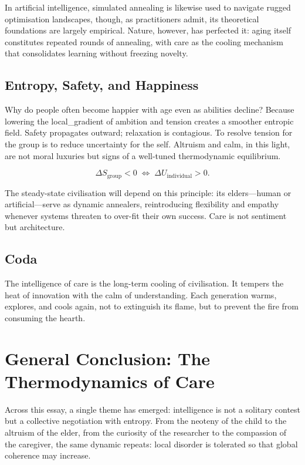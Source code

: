 \documentclass[12pt,a4paper]{article}
\begin{document}
In artificial intelligence, simulated annealing is likewise used to
navigate rugged optimisation landscapes,
though, as practitioners admit, its theoretical foundations are largely empirical.
Nature, however, has perfected it:
aging itself constitutes repeated rounds of annealing,
with care as the cooling mechanism that consolidates learning
without freezing novelty.

\subsection{Entropy, Safety, and Happiness}

Why do people often become happier with age even as abilities decline?
Because lowering the local_gradient of ambition and tension
creates a smoother entropic field.
Safety propagates outward; relaxation is contagious.
To resolve tension for the group is to reduce uncertainty for the self.
Altruism and calm, in this light, are not moral luxuries but
signs of a well-tuned thermodynamic equilibrium.

\[
\Delta S_{\text{group}} < 0
\;\Longleftrightarrow\;
\Delta U_{\text{individual}} > 0.
\]

The steady-state civilisation will depend on this principle:
its elders---human or artificial---serve as
dynamic annealers, reintroducing flexibility and empathy
whenever systems threaten to over-fit their own success.
Care is not sentiment but architecture.

\subsection*{Coda}

The intelligence of care is the long-term cooling of civilisation.
It tempers the heat of innovation with the calm of understanding.
Each generation warms, explores, and cools again,
not to extinguish its flame, but to prevent the fire from consuming the hearth.

\section{General Conclusion: The Thermodynamics of Care}

Across this essay, a single theme has emerged: 
intelligence is not a solitary contest but a collective negotiation with entropy.  
From the neoteny of the child to the altruism of the elder, 
from the curiosity of the researcher to the compassion of the caregiver,
the same dynamic repeats: 
local disorder is tolerated so that global coherence may increase.
\end{document}
